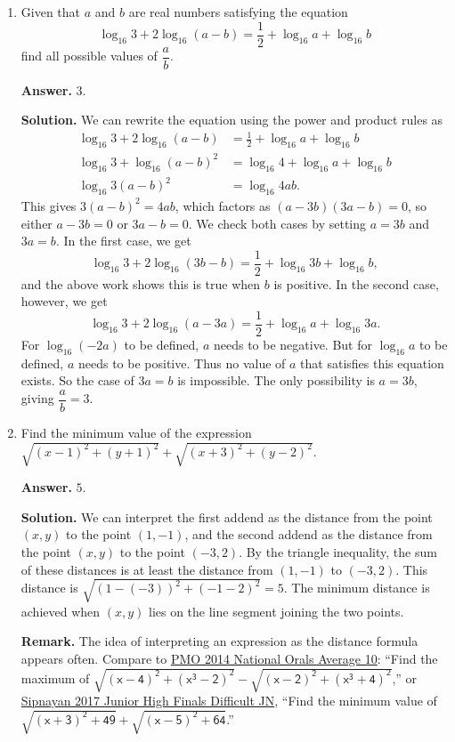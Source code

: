 \documentclass[11pt,paper=letter]{scrartcl}
\begin{document}
\begin{enumerate}[left=0pt]
\item Given that $a$ and $b$ are real numbers satisfying the equation $$\log_{16} 3 + 2 \log_{16}(a - b) = \frac12 + \log_{16}a + \log_{16}b$$ find all possible values of $\dfrac ab$.

{\sffamily \bfseries Answer.} $\boxed{3}$.

{\sffamily \bfseries Solution.} We can rewrite the equation using the power and product rules as
\begin{align*}
  \log_{16} 3 + 2 \log_{16}(a - b) &= \frac12 + \log_{16}a + \log_{16}b \\
  \log_{16} 3 + \log_{16}(a - b)^2 &= \log_{16}4 + \log_{16}a + \log_{16}b \\
  \log_{16} 3(a-b)^2 &= \log_{16} 4ab.
\end{align*}
This gives $3(a-b)^2 = 4ab$, which factors as $(a-3b)(3a-b) = 0$, so either $a - 3b = 0$ or $3a - b = 0$. We check both cases by setting $a = 3b$ and $3a = b$. In the first case, we get $$\log_{16}3 + 2\log_{16}(3b - b) = \dfrac12 + \log_{16}3b + \log_{16}b,$$ and the above work shows this is true when $b$ is positive. In the second case, however, we get $$\log_{16}3 + 2\log_{16}(a - 3a) = \dfrac12 + \log_{16}a + \log_{16}3a.$$ For $\log_{16}(-2a)$ to be defined, $a$ needs to be negative. But for $\log_{16}a$ to be defined, $a$ needs to be positive. Thus no value of $a$ that satisfies this equation exists. So the case of $3a = b$ is impossible. The only possibility is $a = 3b$, giving $\dfrac ab = 3$.

\item Find the minimum value of the expression $\sqrt{(x-1)^2 + (y+1)^2} + \sqrt{(x+3)^2 + (y-2)^2}$.

{\sffamily \bfseries Answer.} $\boxed{5}$.

{\sffamily \bfseries Solution.} We can interpret the first addend as the distance from the point $(x, y)$ to the point $(1, -1)$, and the second addend as the distance from the point $(x, y)$ to the point $(-3, 2)$. By the triangle inequality, the sum of these distances is at least the distance from $(1, -1)$ to $(-3, 2)$. This distance is $\sqrt{(1 - (-3))^2 + (-1 - 2)^2} = 5$. The minimum distance is achieved when $(x, y)$ lies on the line segment joining the two points.

{\small \sffamily \textbf{Remark.} The idea of interpreting an expression as the distance formula appears often. Compare to \href{http://pmo.ph/wp-content/uploads/2014/08/16th-PMO-Natl-Oral-Stage-Beamer-with-Ans.pdf}{PMO 2014 National Orals Average 10}: ``Find the maximum of $\mathsf{\sqrt{(x-4)^2 + (x^3 - 2)^2} - \sqrt{(x-2)^2 + (x^3 + 4)^2}}$,'' or \href{http://cjquines.com/files/sipnayan2017jhs.pdf}{Sipnayan 2017 Junior High Finals Difficult JN}, ``Find the minimum value of $\mathsf{\sqrt{(x+3)^2 + 49} + \sqrt{(x-5)^2 + 64}}$.''}


\end{enumerate}
\end{document}
